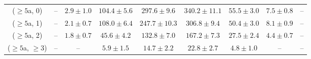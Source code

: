 \begin{table}[h!]
{\begin{tabular}{ccccccccc}
	($\ge5$a, 0) & -- & $2.9\pm 1.0$ & $104.4\pm 5.6$ & $297.6\pm 9.6$ & $340.2\pm 11.1$ & $55.5\pm 3.0$ & $7.5\pm 0.8$ & -- \\[0.5ex] 
	($\ge5$a, 1) & -- & $2.1\pm 0.7$ & $108.0\pm 6.4$ & $247.7\pm 10.3$ & $306.8\pm 9.4$ & $50.4\pm 3.0$ & $8.1\pm 0.9$ & -- \\[0.5ex] 
	($\ge5$a, 2) & -- & $1.8\pm 0.7$ & $45.6\pm 4.2$ & $132.8\pm 7.0$ & $167.2\pm 7.3$ & $27.5\pm 2.4$ & $4.4\pm 0.7$ & -- \\[0.5ex] 
	($\ge5$a, $\ge3$) & -- & -- & $5.9\pm 1.5$ & $14.7\pm 2.2$ & $22.8\pm 2.7$ & $4.8\pm 1.0$ & -- & -- \\[0.5ex] 
	\hline
	\hline
\end{tabular}}
\end{table}
